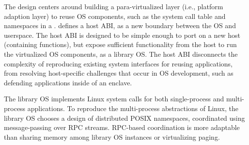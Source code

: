 \label{sec:graphene:summary}

The \graphene{} design centers around
building a para-virtualized layer (i.e., platform adaption layer) to reuse OS components, such as the system call table and namespaces in a \libos{}. %
\graphene{} defines a host ABI, as a new boundary between the OS and userspace.
The host ABI is designed to be simple enough to port on a new host (containing \palcallnum{} functions),
but expose sufficient functionality from the host to run the virtualized OS components, as a library OS.
The host ABI disconnects the complexity of reproducing existing system interfaces for reusing applications,
from resolving host-specific challenges that occur in OS development,
such as defending applications inside of an \sgx{} enclave.


The \graphene{} library OS implements Linux system calls for both single-process and multi-process applications.
To reproduce the multi-process abstractions of Linux,
the library OS chooses a design of distributed POSIX namespaces,
coordinated using message-passing over RPC streams.
RPC-based coordination is more adaptable than sharing memory among library OS instances or virtualizing paging.








